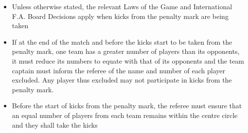 \begin{itemize}
\item Unless otherwise stated, the relevant Laws of the Game and International F.A. Board Decisions apply when kicks from the penalty mark are being taken
\item If at the end of the match and before the kicks start to be taken from the penalty mark, one team has a greater number of players than its opponents, it must reduce its numbers to equate with that of its opponents and the team captain must inform the referee of the name and number of each player excluded. Any player thus excluded may not participate in kicks from the penalty mark.
\item Before the start of kicks from the penalty mark, the referee must ensure that an equal number of players from each team remains within the centre circle and they shall take the kicks
\end{itemize}